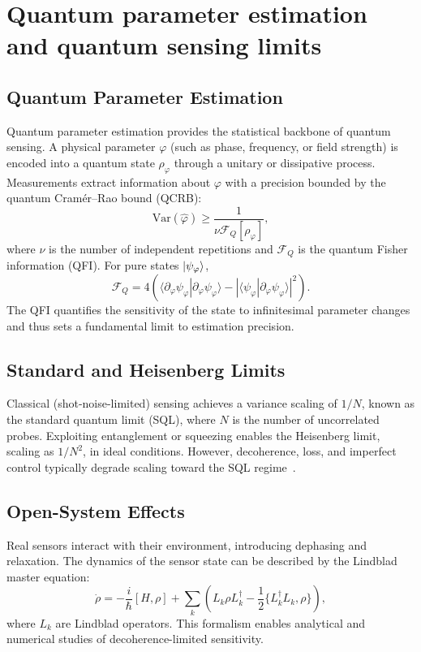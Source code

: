 \section{Quantum parameter estimation and quantum sensing limits}
\label{sec:theoretical_framework}
\subsection*{Quantum Parameter Estimation}
Quantum parameter estimation provides the statistical backbone of quantum sensing. A physical parameter $\varphi$ (such as phase, frequency, or field strength) is encoded into a quantum state $\rho_\varphi$ through a unitary or dissipative process. Measurements extract information about $\varphi$ with a precision bounded by the quantum Cramér--Rao bound (QCRB):
\begin{equation}
\mathrm{Var}(\hat{\varphi}) \ge \frac{1}{\nu \mathcal{F}_Q[\rho_\varphi]},
\end{equation}
where $\nu$ is the number of independent repetitions and $\mathcal{F}_Q$ is the quantum Fisher information (QFI). For pure states $\ket{\psi_\varphi}$,
\begin{equation}
\mathcal{F}_Q = 4 \left( \langle \partial_\varphi \psi_\varphi | \partial_\varphi \psi_\varphi \rangle - | \langle \psi_\varphi | \partial_\varphi \psi_\varphi \rangle |^2 \right).
\end{equation}
The QFI quantifies the sensitivity of the state to infinitesimal parameter changes and thus sets a fundamental limit to estimation precision.

\subsection*{Standard and Heisenberg Limits}
Classical (shot-noise-limited) sensing achieves a variance scaling of $1/N$, known as the standard quantum limit (SQL), where $N$ is the number of uncorrelated probes. Exploiting entanglement or squeezing enables the Heisenberg limit, scaling as $1/N^2$, in ideal conditions. However, decoherence, loss, and imperfect control typically degrade scaling toward the SQL regime~\cite{Preskill2011}.

\subsection*{Open-System Effects}
Real sensors interact with their environment, introducing dephasing and relaxation. The dynamics of the sensor state can be described by the Lindblad master equation:
\begin{equation}
\dot{\rho} = -\frac{i}{\hbar} [H,\rho] + \sum_k \left( L_k \rho L_k^\dagger - \frac{1}{2} \{ L_k^\dagger L_k, \rho \} \right),
\end{equation}
where $L_k$ are Lindblad operators. This formalism enables analytical and numerical studies of decoherence-limited sensitivity.

